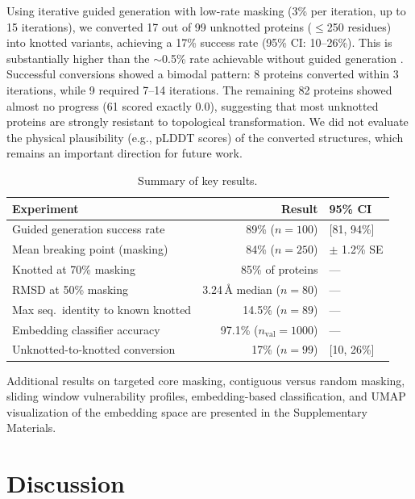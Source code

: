 \documentclass{article}
\begin{document}
Using iterative guided generation with low-rate masking (3\% per iteration, up to 15 iterations), we converted 17 out of 99 unknotted proteins ($\leq$250 residues) into knotted variants, achieving a 17\% success rate (95\% CI: 10--26\%). This is substantially higher than the $\sim$0.5\% rate achievable without guided generation \cite{klimentova2024unveiling}. Successful conversions showed a bimodal pattern: 8 proteins converted within 3 iterations, while 9 required 7--14 iterations. The remaining 82 proteins showed almost no progress (61 scored exactly 0.0), suggesting that most unknotted proteins are strongly resistant to topological transformation. We did not evaluate the physical plausibility (e.g., pLDDT scores) of the converted structures, which remains an important direction for future work.

\begin{table}[t]
\caption{Summary of key results.}
\label{tab:summary}
\begin{center}
\begin{small}
\begin{tabular}{lrl}
\toprule
Experiment & Result & 95\% CI \\
\midrule
Guided generation success rate & 89\% ($n=100$) & [81, 94\%] \\
Mean breaking point (masking) & 84\% ($n=250$) & $\pm$ 1.2\% SE \\
Knotted at 70\% masking & 85\% of proteins & --- \\
RMSD at 50\% masking & 3.24\,\AA{} median ($n=80$) & --- \\
Max seq.\ identity to known knotted & 14.5\% ($n=89$) & --- \\
Embedding classifier accuracy & 97.1\% ($n_\text{val}=1000$) & --- \\
Unknotted-to-knotted conversion & 17\% ($n=99$) & [10, 26\%] \\
\bottomrule
\end{tabular}
\end{small}
\end{center}
\end{table}

Additional results on targeted core masking, contiguous versus random masking, sliding window vulnerability profiles, embedding-based classification, and UMAP visualization of the embedding space are presented in the Supplementary Materials.

\section{Discussion}
\end{document}
